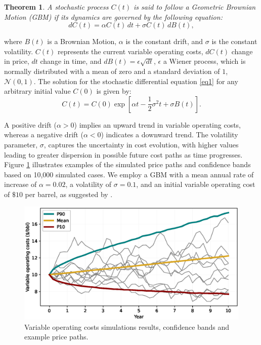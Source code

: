 \documentclass[pdflatex,sn-basic]{sn-jnl}%
\theoremstyle{thmstyleone}%
\newtheorem{theorem}{Theorem}%
\theoremstyle{thmstyletwo}%
\theoremstyle{thmstylethree}%
\begin{document}
\begin{theorem}
\theoremstyle{thmstyletwo}
A stochastic process $C(t)$ is said to follow a Geometric Brownian Motion (GBM) if its dynamics are governed by the following equation: 
\begin{equation}
dC(t) = \alpha C(t)\,dt + \sigma C(t)\,dB(t),
\label{eq1}
\end{equation}
\end{theorem} 
\noindent
where $B(t)$ is a Brownian Motion, $\alpha$ is the constant drift, and $\sigma$ is the constant volatility. $C(t)$ represents the current variable operating costs, $dC(t)$ change in price, $dt$ change in time, and $dB(t)=\epsilon \sqrt{dt}$, $\epsilon$ a Wiener process, which is normally distributed with a mean of zero and a standard deviation of $1$, $\mathcal{N}(0, 1)$. The solution for the stochastic differential equation \ref{eq1} for any arbitrary initial value $C(0)$ is given by:
\begin{equation}
C(t) = C(0) \exp\left[ \alpha t - \frac{1}{2} \sigma^2 t + \sigma B(t) \right].
\label{eq2}
\end{equation}

A positive drift ($\alpha > 0$) implies an upward trend in variable operating costs, whereas a negative drift ($\alpha < 0$) indicates a downward trend. The volatility parameter, $\sigma$, captures the uncertainty in cost evolution, with higher values leading to greater dispersion in possible future cost paths as time progresses. Figure \ref{fig10} illustrates examples of the simulated price paths and confidence bands based on 10,000 simulated cases. We employ a GBM with a mean annual rate of increase of $\alpha=0.02$, a volatility of $\sigma=0.1$, and an initial variable operating cost of $\$10$ per barrel, as suggested by \cite{ref12a}.

\begin{figure}[H]
\centering
\begin{minipage}{0.95\textwidth}
  \includegraphics[width=\textwidth]{VOC_profile.eps}
  \caption{Variable operating costs simulations results, confidence bands and example price paths.}
  \label{fig10}
\end{minipage}
\end{figure}
\end{document}
